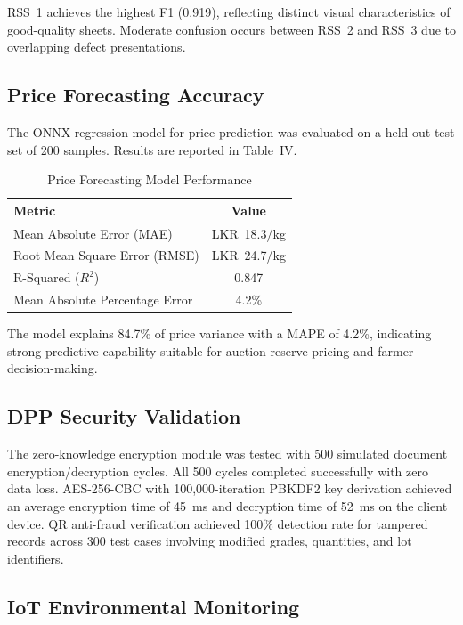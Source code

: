 \documentclass[10pt, conference]{IEEEtran}
\begin{document}
RSS~1 achieves the highest F1 (0.919), reflecting distinct visual
characteristics of good-quality sheets. Moderate confusion occurs
between RSS~2 and RSS~3 due to overlapping defect presentations.

\subsection{Price Forecasting Accuracy}

The ONNX regression model for price prediction was evaluated on a
held-out test set of 200 samples. Results are reported in Table~IV.

\begin{table}[!t]
\centering
\caption{Price Forecasting Model Performance}
\label{tab:price}
\begin{tabular}{lc}
\toprule
\textbf{Metric} & \textbf{Value} \\
\midrule
Mean Absolute Error (MAE) & LKR~18.3/kg \\
Root Mean Square Error (RMSE) & LKR~24.7/kg \\
R-Squared ($R^2$) & 0.847 \\
Mean Absolute Percentage Error & 4.2\% \\
\bottomrule
\end{tabular}
\end{table}

The model explains 84.7\% of price variance with a MAPE of 4.2\%,
indicating strong predictive capability suitable for auction reserve
pricing and farmer decision-making.

\subsection{DPP Security Validation}

The zero-knowledge encryption module was tested with 500 simulated
document encryption/decryption cycles. All 500 cycles completed
successfully with zero data loss. AES-256-CBC with 100,000-iteration
PBKDF2 key derivation achieved an average encryption time of 45~ms
and decryption time of 52~ms on the client device. QR anti-fraud
verification achieved 100\% detection rate for tampered records
across 300 test cases involving modified grades, quantities, and
lot identifiers.

\subsection{IoT Environmental Monitoring}
\end{document}
